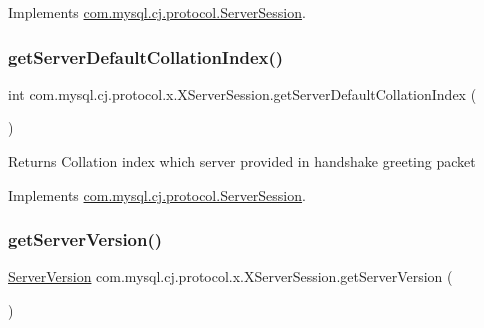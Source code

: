 Implements \mbox{\hyperlink{interfacecom_1_1mysql_1_1cj_1_1protocol_1_1_server_session_afeb928036af67a7fff2d45783673c72d}{com.\+mysql.\+cj.\+protocol.\+Server\+Session}}.

\mbox{\label{classcom_1_1mysql_1_1cj_1_1protocol_1_1x_1_1_x_server_session_abbcbd0f1d4c0c4fab564b3ce8083ecf7}} 
\subsubsection{\texorpdfstring{get\+Server\+Default\+Collation\+Index()}{getServerDefaultCollationIndex()}}
{\footnotesize\ttfamily int com.\+mysql.\+cj.\+protocol.\+x.\+X\+Server\+Session.\+get\+Server\+Default\+Collation\+Index (\begin{DoxyParamCaption}{ }\end{DoxyParamCaption})}

\begin{DoxyReturn}{Returns}
Collation index which server provided in handshake greeting packet 
\end{DoxyReturn}


Implements \mbox{\hyperlink{interfacecom_1_1mysql_1_1cj_1_1protocol_1_1_server_session_a840bf74b75252459afd6b33ae21c8379}{com.\+mysql.\+cj.\+protocol.\+Server\+Session}}.

\mbox{\label{classcom_1_1mysql_1_1cj_1_1protocol_1_1x_1_1_x_server_session_a55b0588085914fbaa110c3e593efec8f}} 
\subsubsection{\texorpdfstring{get\+Server\+Version()}{getServerVersion()}}
{\footnotesize\ttfamily \mbox{\hyperlink{classcom_1_1mysql_1_1cj_1_1_server_version}{Server\+Version}} com.\+mysql.\+cj.\+protocol.\+x.\+X\+Server\+Session.\+get\+Server\+Version (\begin{DoxyParamCaption}{ }\end{DoxyParamCaption})}

